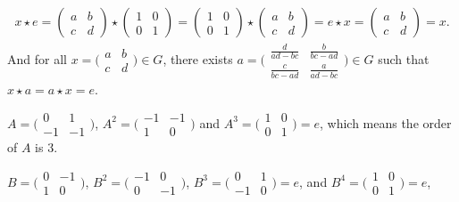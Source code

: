 \documentclass{article}[12pt]
\begin{document}
\begin{itemize}
\begin{align*}
x\star e=\left( \begin{matrix}a & b\\c & d\end{matrix}\right) \star \left( \begin{matrix}1 & 0\\0& 1\end{matrix}\right)=\left( \begin{matrix}1 & 0\\0& 1\end{matrix}\right)\star \left( \begin{matrix}a & b\\c & d\end{matrix}\right)=e\star x =\left( \begin{matrix}a & b\\c & d\end{matrix}\right) =x.
\end{align*}
And for all $x=\bigl( \begin{smallmatrix} a & b \\ c & d \end{smallmatrix} \bigr)\in G$, there exists $a=\bigl( \begin{smallmatrix} \frac{d}{ad-bc} & \frac{b}{bc-ad} \\ \frac{c}{bc-ad} & \frac{a}{ad-bc} \end{smallmatrix} \bigr)\in G$ such that $x\star a=a\star x=e$.
\end{itemize}
\par $A=\bigl( \begin{smallmatrix} 0 & 1 \\ -1 & -1 \end{smallmatrix} \bigr)$, $A^2=\bigl( \begin{smallmatrix} -1 & -1 \\ 1 & 0\end{smallmatrix} \bigr)$ and $A^3=\bigl( \begin{smallmatrix} 1 & 0 \\ 0 & 1\end{smallmatrix} \bigr)=e$, which means the order of $A$ is 3.
\par
$B=\bigl( \begin{smallmatrix} 0 & -1 \\ 1 & 0 \end{smallmatrix} \bigr)$, $B^2=\bigl( \begin{smallmatrix} -1 & 0 \\ 0 & -1\end{smallmatrix} \bigr)$, $B^3=\bigl( \begin{smallmatrix} 0 & 1 \\ -1 &0\end{smallmatrix} \bigr)=e$, and $B^4=\bigl( \begin{smallmatrix} 1 & 0 \\0 &1\end{smallmatrix} \bigr)=e$,
\end{document}
